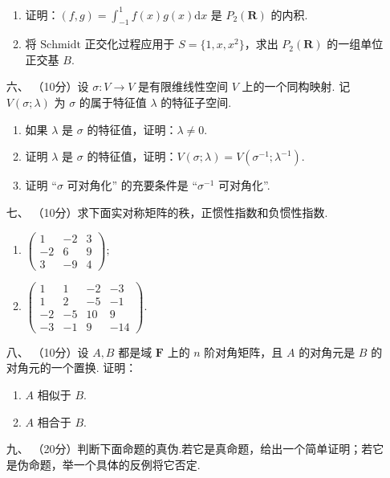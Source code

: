 \begin{enumerate}
    \begin{enumerate}[label=(\arabic*)]
        \item 证明：$(f,g)=\int_{-1}^1f(x)g(x)\mathrm{d}x$ 是 $P_2(\mathbf{R})$ 的内积.
        \item 将 $\mathrm{Schmidt}$ 正交化过程应用于 $S=\{1,x,x^2\}$，求出 $P_2(\mathbf{R})$ 的一组单位正交基 $B.$
    \end{enumerate}
    \item [六、]（10分）设 $\sigma:V\to V$ 是有限维线性空间 $V$ 上的一个同构映射. 记 $V(\sigma;\lambda)$ 为 $\sigma$ 的属于特征值 $\lambda$ 的特征子空间.
    \begin{enumerate}[label=(\arabic*)]
        \item 如果 $\lambda$ 是 $\sigma$ 的特征值，证明：$\lambda \neq 0.$
        \item 证明 $\lambda$ 是 $\sigma$ 的特征值，证明：$V(\sigma;\lambda)=V(\sigma^{-1};\lambda^{-1}).$
        \item 证明 “$\sigma$ 可对角化” 的充要条件是 “$\sigma^{-1}$ 可对角化”.
    \end{enumerate}
    \item [七、]（10分）求下面实对称矩阵的秩，正惯性指数和负惯性指数.
    \begin{enumerate}[label=(\arabic*)]
        \item $\begin{pmatrix}1 & -2 & 3 \\ -2 & 6 & 9 \\ 3 & -9 & 4\end{pmatrix};$
        \item $\begin{pmatrix}1 & 1 & -2 & -3\\ 1 & 2 & -5 & -1 \\ -2 & -5 & 10 & 9 \\ -3 & -1 & 9 & -14\end{pmatrix}.$
    \end{enumerate}
    \item [八、]（10分）设 $A,B$ 都是域 $\mathbf{F}$ 上的 $n$ 阶对角矩阵，且 $A$ 的对角元是 $B$ 的对角元的一个置换. 证明：
    \begin{enumerate}[label=(\arabic*)]
        \item $A$ 相似于 $B.$
        \item $A$ 相合于 $B.$
    \end{enumerate}
    \item [九、]（20分）判断下面命题的真伪.若它是真命题，给出一个简单证明；若它是伪命题，举一个具体的反例将它否定.

\end{enumerate}
